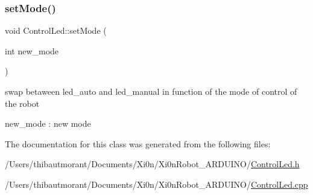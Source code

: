 \subsubsection{\texorpdfstring{set\+Mode()}{setMode()}}
{\footnotesize\ttfamily void Control\+Led\+::set\+Mode (\begin{DoxyParamCaption}\item[{int}]{new\+\_\+mode }\end{DoxyParamCaption})}



swap betaween led\+\_\+auto and led\+\_\+manual in function of the mode of control of the robot 

new\+\_\+mode \+: new mode 

The documentation for this class was generated from the following files\+:\begin{DoxyCompactItemize}
\item 
/\+Users/thibautmorant/\+Documents/\+Xi0n/\+Xi0n\+Robot\+\_\+\+A\+R\+D\+U\+I\+N\+O/\hyperlink{_control_led_8h}{Control\+Led.\+h}\item 
/\+Users/thibautmorant/\+Documents/\+Xi0n/\+Xi0n\+Robot\+\_\+\+A\+R\+D\+U\+I\+N\+O/\hyperlink{_control_led_8cpp}{Control\+Led.\+cpp}\end{DoxyCompactItemize}
